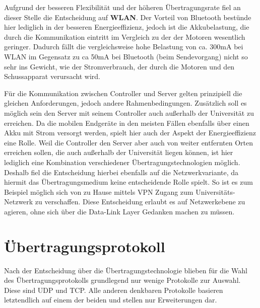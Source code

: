 Aufgrund der besseren Flexibilität und der höheren Übertragungsrate fiel an dieser Stelle die Entscheidung auf \textbf{WLAN}. Der Vorteil von Bluetooth bestünde hier lediglich in der besseren Energieeffizienz, jedoch ist die Akkubelastung, die durch die Kommunikation eintritt im Vergleich zu der der Motoren wesentlich geringer. Dadurch fällt die vergleichsweise hohe Belastung von ca. 300mA bei WLAN im Gegensatz zu ca 50mA bei Bluetooth (beim Sendevorgang) nicht so sehr ins Gewicht, wie der Stromverbrauch, der durch die Motoren und den Schussapparat verursacht wird.

Für die Kommunikation zwischen Controller und Server gelten prinzipiell die gleichen Anforderungen, jedoch andere Rahmenbedingungen. Zusätzlich soll es möglich sein den Server mit seinem Controller auch außerhalb der Universität zu erreichen. Da die mobilen Endgeräte in den meisten Fällen ebenfalls über einen Akku mit Strom versorgt werden, spielt hier auch der Aspekt der Energieeffizienz eine Rolle. Weil die Controller den Server aber auch von weiter entfernten Orten erreichen sollen, die auch außerhalb der Universität liegen können, ist hier lediglich eine Kombination verschiedener Übertragungstechnologien möglich. Deshalb fiel die Entscheidung hierbei ebenfalls auf die Netzwerkvariante, da hiermit das Übertragungsmedium keine entscheidende Rolle spielt. So ist es zum Beispiel möglich sich von zu Hause mittels VPN Zugang zum Universitäts-Netzwerk zu verschaffen. Diese Entscheidung erlaubt es auf Netzwerkebene zu agieren, ohne sich über die Data-Link Layer Gedanken machen zu müssen.




\section{Übertragungsprotokoll}
Nach der Entscheidung über die Übertragungstechnologie blieben für die Wahl des Übertragungsprotokolls grundlegend nur wenige Protokolle zur Auswahl. Diese sind UDP und TCP. Alle anderen denkbaren Protokolle basieren letztendlich auf einem der beiden und stellen nur Erweiterungen dar.

